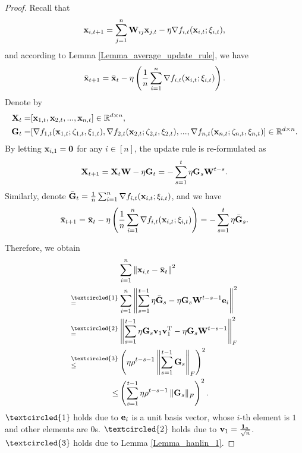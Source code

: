 \documentclass{article}
\begin{document}
\begin{proof}


Recall that 
\begin{align}
\nonumber
{\bf x}_{i,t+1} = \sum_{j=1}^n {\bf W}_{ij}{\bf x}_{j,t} - \eta \nabla f_{i,t}({\bf x}_{i,t};\xi_{i,t}), 
\end{align} and according to Lemma \ref{Lemma_average_update_rule}, we have 
\begin{align}
\nonumber
\bar{{\bf x}}_{t+1} = \bar{{\bf x}}_t - \eta \left( \frac{1}{n}\sum_{i=1}^n \nabla f_{i,t}({\bf x}_{i,t};\xi_{i,t}) \right).
\end{align} Denote by
\begin{align}
\nonumber
{\bf X}_t = &  [{\bf x}_{1,t}, {\bf x}_{2,t}, ..., {\bf x}_{n,t}] \in \mathbb{R}^{d\times n}, \\ \nonumber
{\bf G}_t = & [\nabla f_{1,t}({\bf x}_{1,t};\zeta_{1,t},\xi_{1,t}), \nabla f_{2,t}({\bf x}_{2,t};\zeta_{2,t},\xi_{2,t}), ..., \nabla f_{n,t}({\bf x}_{n,t};\zeta_{n,t},\xi_{n,t})] \in \mathbb{R}^{d\times n}.
\end{align} By letting ${\bf x}_{i,1} = {\bf 0}$ for any $i\in[n]$, the update rule is re-formulated as 
\begin{align}
\nonumber
{\bf X}_{t+1} = {\bf X}_t {\bf W} - \eta {\bf G}_t = - \sum_{s=1}^t \eta {\bf G}_s {\bf W}^{t-s}. 
\end{align} Similarly, denote $\bar{{\bf G}}_t = \frac{1}{n}\sum_{i=1}^n \nabla f_{i,t}({\bf x}_{i,t};\xi_{i,t})$, and we have
\begin{align*}
\bar{{\bf x}}_{t+1} = \bar{{\bf x}}_t - \eta \left( \frac{1}{n}\sum_{i=1}^n \nabla f_{i,t}({\bf x}_{i,t};\xi_{i,t}) \right) = - \sum_{s=1}^t \eta \bar{{\bf G}}_s. 
\end{align*}

Therefore, we obtain
\begin{align}
\nonumber
& \sum_{i=1}^n \lrnorm{\x_{i,t} - \bar{\x}_t}^2 \\ \nonumber
\refabovecir{=}{\textcircled{1}} & \sum_{i=1}^n \lrnorm{ \sum_{s=1}^{t-1} \eta \bar{\G}_s - \eta \G_s \W^{t-s-1}\e_i }^2   \\ \nonumber
\refabovecir{=}{\textcircled{2}} & \lrnorm{ \sum_{s=1}^{t-1} \eta \G_s\v_1 \v_1\Tr - \eta \G_s \W^{t-s-1} }^2_F   \\ \nonumber
\refabovecir{\le}{\textcircled{3}} & \lrincir{ \eta \rho^{t-s-1} \lrnorm{\sum_{s=1}^{t-1}\G_s}_F}^2 \\ \nonumber
\le & \lrincir{ \sum_{s=1}^{t-1} \eta \rho^{t-s-1} \lrnorm{\G_s}_F}^2.
\end{align} $\textcircled{1}$ holds due to ${\bf e}_i$ is a unit basis vector, whose $i$-th element is $1$ and other elements are $0$s. $\textcircled{2}$ holds due to ${\bf v}_1 = \frac{{\bf 1}_n}{\sqrt{n}}$. $\textcircled{3}$ holds due to Lemma \ref{Lemma_hanlin_1}. 



\end{proof}
\end{document}

